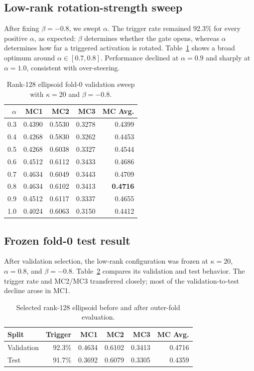 \documentclass[11pt]{article}
\begin{document}
\subsection{Low-rank rotation-strength sweep}

After fixing $\beta=-0.8$, we swept $\alpha$.  The trigger rate remained
92.3\% for every positive $\alpha$, as expected: $\beta$ determines whether
the gate opens, whereas $\alpha$ determines how far a triggered activation is
rotated.  Table~\ref{tab:lowrank-alpha} shows a broad optimum around
$\alpha\in[0.7,0.8]$.  Performance declined at $\alpha=0.9$ and sharply at
$\alpha=1.0$, consistent with over-steering.

\begin{table}[ht]
\centering
\caption{Rank-128 ellipsoid fold-0 validation sweep with $\kappa=20$ and
$\beta=-0.8$.}
\label{tab:lowrank-alpha}
\begin{tabular}{rrrrr}
\toprule
$\alpha$ & MC1 & MC2 & MC3 & MC Avg.\\
\midrule
0.3 & 0.4390 & 0.5530 & 0.3278 & 0.4399\\
0.4 & 0.4268 & 0.5830 & 0.3262 & 0.4453\\
0.5 & 0.4268 & 0.6038 & 0.3327 & 0.4544\\
0.6 & 0.4512 & 0.6112 & 0.3433 & 0.4686\\
0.7 & 0.4634 & 0.6049 & 0.3443 & 0.4709\\
0.8 & 0.4634 & 0.6102 & 0.3413 & \textbf{0.4716}\\
0.9 & 0.4512 & 0.6117 & 0.3337 & 0.4655\\
1.0 & 0.4024 & 0.6063 & 0.3150 & 0.4412\\
\bottomrule
\end{tabular}
\end{table}

\subsection{Frozen fold-0 test result}

After validation selection, the low-rank configuration was frozen at
$\kappa=20$, $\alpha=0.8$, and $\beta=-0.8$.  Table~\ref{tab:lowrank-test}
compares its validation and test behavior.  The trigger rate and MC2/MC3
transferred closely; most of the validation-to-test decline arose in MC1.

\begin{table}[ht]
\centering
\caption{Selected rank-128 ellipsoid before and after outer-fold evaluation.}
\label{tab:lowrank-test}
\begin{tabular}{lrrrrr}
\toprule
Split & Trigger & MC1 & MC2 & MC3 & MC Avg.\\
\midrule
Validation & 92.3\% & 0.4634 & 0.6102 & 0.3413 & 0.4716\\
Test       & 91.7\% & 0.3692 & 0.6079 & 0.3305 & 0.4359\\
\bottomrule
\end{tabular}
\end{table}
\end{document}
